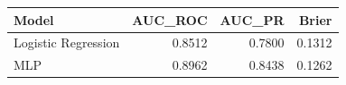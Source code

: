 \begin{tabular}{lrrr}
\toprule
Model & AUC_ROC & AUC_PR & Brier \\
\midrule
Logistic Regression & 0.8512 & 0.7800 & 0.1312 \\
MLP & 0.8962 & 0.8438 & 0.1262 \\
\bottomrule
\end{tabular}
